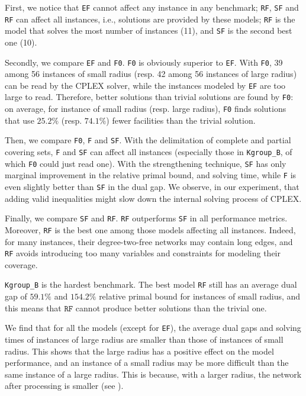 \documentclass[review]{elsarticle}
\theoremstyle{definition}
\begin{document}
 First, we notice that \texttt{EF} cannot affect any instance in any benchmark; \texttt{RF}, \texttt{SF} and \texttt{RF} can affect all instances, i.e., solutions are provided by these models; \texttt{RF} is the model that solves the most number of instances (11), and \texttt{SF} is the second best one (10).
 
 Secondly, we compare \texttt{EF} and \texttt{F0}. \texttt{F0} is obviously superior to \texttt{EF}. With \texttt{F0}, 39 among 56 instances of small radius (resp. 42 among 56 instances of large radius) can be read by the CPLEX solver, while the instances modeled by \texttt{EF} are too large to read. Therefore, better solutions than trivial solutions are found by \texttt{F0}: on average, for instance of small radius (resp. large radius), \texttt{F0} finds solutions that use $25.2\%$ (resp. $74.1\%$) fewer facilities than the trivial solution.

Then, we compare \texttt{F0}, \texttt{F}  and \texttt{SF}. With the delimitation of complete and partial covering sets, \texttt{F} and \texttt{SF} can affect all instances (especially those in \texttt{Kgroup\_B}, of which \texttt{F0} could just read one).
With the strengthening technique, \texttt{SF} has only marginal improvement in the relative primal bound, and solving time, while \texttt{F} is even slightly better than \texttt{SF} in the dual gap. We observe, in our experiment, that adding valid inequalities might slow down the internal solving process of CPLEX.

Finally, we compare  \texttt{SF} and \texttt{RF}. \texttt{RF} outperforms \texttt{SF} in all performance metrics. Moreover,  \texttt{RF} is the best one among those models affecting all instances. Indeed, for many instances, their degree-two-free networks may contain long edges, and \texttt{RF} avoids introducing too many variables and constraints for modeling their coverage.

\texttt{Kgroup\_B} is the hardest benchmark. The best model \texttt{RF} still has  an average dual gap of $59.1\%$ and $154.2\%$ relative primal bound for instances of small radius, and this means that $\texttt{RF}$ cannot produce better solutions than the trivial one.

We find that for all the models (except for \texttt{EF}), the average dual gaps and solving times of instances of large radius are smaller than those of instances of small radius. This shows that the large radius has a positive effect on the model performance, and an instance of a small radius may be more difficult than the same instance of a large radius. This is because, with a larger radius, the network after processing is smaller (see ).
\end{document}
